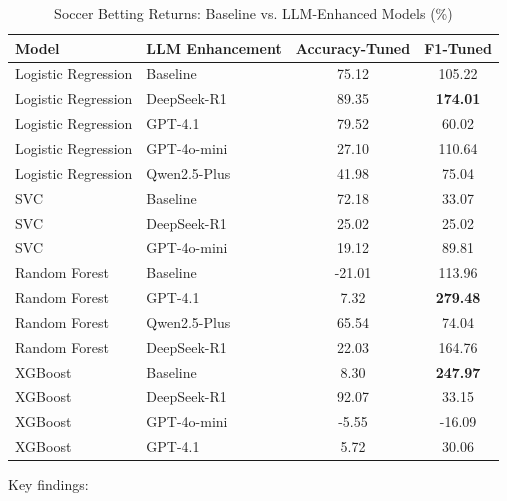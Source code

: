\begin{table}[htbp]
\centering
\caption{Soccer Betting Returns: Baseline vs. LLM-Enhanced Models (\%)}
\label{tab:soccer_results}
\begin{tabular}{@{}llcc@{}}
\toprule
\textbf{Model} & \textbf{LLM Enhancement} & \textbf{Accuracy-Tuned} & \textbf{F1-Tuned} \\
\midrule
Logistic Regression & Baseline & 75.12 & 105.22 \\
Logistic Regression & DeepSeek-R1 & 89.35 & \textbf{174.01} \\
Logistic Regression & GPT-4.1 & 79.52 & 60.02 \\
Logistic Regression & GPT-4o-mini & 27.10 & 110.64 \\
Logistic Regression & Qwen2.5-Plus & 41.98 & 75.04 \\
\midrule
SVC & Baseline & 72.18 & 33.07 \\
SVC & DeepSeek-R1 & 25.02 & 25.02 \\
SVC & GPT-4o-mini & 19.12 & 89.81 \\
\midrule
Random Forest & Baseline & -21.01 & 113.96 \\
Random Forest & GPT-4.1 & 7.32 & \textbf{279.48} \\
Random Forest & Qwen2.5-Plus & 65.54 & 74.04 \\
Random Forest & DeepSeek-R1 & 22.03 & 164.76 \\
\midrule
XGBoost & Baseline & 8.30 & \textbf{247.97} \\
XGBoost & DeepSeek-R1 & 92.07 & 33.15 \\
XGBoost & GPT-4o-mini & -5.55 & -16.09 \\
XGBoost & GPT-4.1 & 5.72 & 30.06 \\
\bottomrule
\end{tabular}
\end{table}

Key findings:

